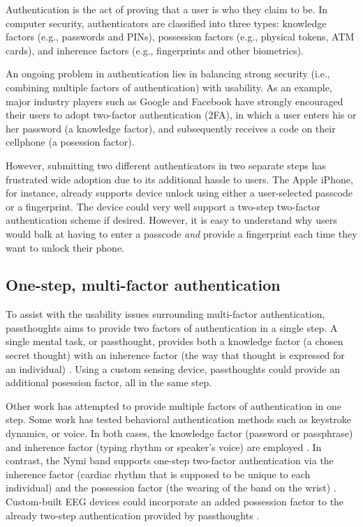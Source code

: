 \documentclass[sigconf]{acmart}
\begin{document}
Authentication is the act of proving that a user is who they claim to be.
In computer security, authenticators are classified into three types: knowledge factors (e.g., passwords
and PINs), possession factors (e.g., physical tokens, ATM cards), and inherence
factors (e.g., fingerprints and other biometrics). 

An ongoing problem in authentication lies in balancing strong security
(i.e., combining multiple factors of authentication)
with usability.
As an example, major industry players such as Google and
Facebook have strongly encouraged their users to adopt two-factor
authentication (2FA), in which a user enters his or her password (a knowledge factor),
and subsequently receives a code on their cellphone (a posession factor).

However, submitting two different 
authenticators in two separate steps has frustrated wide adoption
due to its additional hassle to users. The Apple iPhone, for instance,
already supports device unlock using either a user-selected passcode or a fingerprint. The
device could very well support a two-step two-factor authentication scheme if
desired. However, it is easy to understand why users would balk at having to
enter a passcode \emph{and} provide a fingerprint each time they want to unlock their phone.

\subsection{One-step, multi-factor authentication}
\label{sec:org578b4c9}

To assist with the usability issues surrounding multi-factor authentication,
passthoughts aims to provide two factors of authentication in a single step.
A single mental task, or passthought, provides both a knowledge factor (a chosen secret thought)
with an inherence factor (the way that thought is expressed for an individual) \cite{Chuang2013b,Johnson2014}.
Using a custom sensing device, passthoughts could provide an additional posession factor, all in the same step.

Other work has attempted to provide multiple factors of authentication in one step.
Some work has tested behavioral authentication methods such as keystroke dynamics, or voice. In both cases, the knowledge factor (password or passphrase) and
inherence factor (typing rhythm or speaker's voice) are employed \cite{Monrose1997}.
In contrast, the Nymi band supports one-step two-factor authentication via the inherence
factor (cardiac rhythm that is supposed to be unique to each individual) and the
possession factor (the wearing of the band on the wrist) \cite{Nymi}.
Custom-built EEG devices could incorporate an added possession factor 
to the already two-step authentication provided by passthoughts \cite{Curran2017}.
\end{document}
